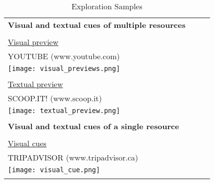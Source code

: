 \begin{longtable}{|p{0.90\linewidth}|}
\caption{Exploration Samples}\\

\hline
\textbf{Visual and textual cues of multiple resources}  \\
\\
\underline{Visual preview}                 \\
YOUTUBE (www.youtube.com)\\
\texttt{[image: visual\_previews.png]}\\
\\
\underline{Textual preview} \\
SCOOP.IT! (www.scoop.it)\\
\texttt{[image: textual\_preview.png]}\\
\\
\hline
\pagebreak
\hline
\textbf{Visual and textual cues of a single resource} \\
\\
\underline{Visual cues}                  \\
TRIPADVISOR (www.tripadvisor.ca)\\
\texttt{[image: visual\_cue.png]}\\
\\


\end{longtable}
